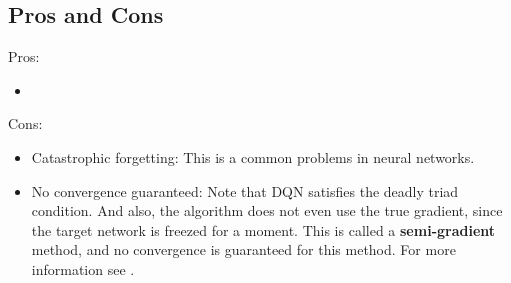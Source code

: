     \subsection{Pros and Cons}
        Pros:
        \begin{itemize}
            \item 
        \end{itemize}
        Cons:
        \begin{itemize}
            \item Catastrophic forgetting: This is a common problems in neural networks.
            \item No convergence guaranteed: Note that DQN satisfies the deadly triad condition.
                And also, the algorithm does not even use the true gradient, since the target network is freezed for a moment. This is called a \textbf{semi-gradient} method,
                and no convergence is guaranteed for this method. For more information see \cite{Sutton2020}.
        \end{itemize}